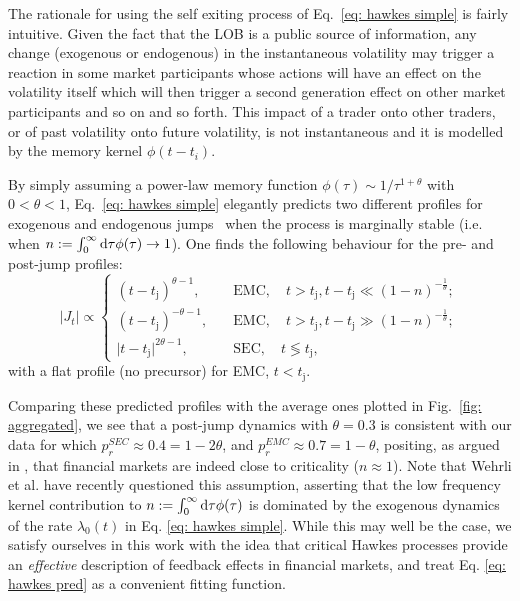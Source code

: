 \documentclass[amsmath,amssymb,aps,pre,floatfix,twocolumn,superscriptaddress]{revtex4}
\begin{document}
The rationale for using the self exiting process of Eq.~\eqref{eq: hawkes simple} is fairly intuitive. Given the fact that the LOB is a public source of information, any change (exogenous or endogenous) in the instantaneous volatility may trigger a reaction in some market participants whose actions will have an effect on the volatility itself which will then trigger a second generation effect on other market participants and so on and so forth. This impact of a trader onto other traders, or of past volatility onto future volatility, is not instantaneous and it is modelled by the memory kernel $\phi(t-t_i)$.

By simply assuming a power-law memory function $\phi(\tau) \sim 1/\tau^{1+\theta}$ with $0<\theta<1$, Eq.~\eqref{eq: hawkes simple} elegantly predicts two different profiles for exogenous and endogenous jumps~\cite{helmstetter2002subcritical,sornette_books} when the process is marginally stable (i.e. when $n := \int_0^\infty {\rm d}\tau \phi(\tau) \to 1$). One finds the following behaviour for the pre- and post-jump profiles:
\begin{equation}\label{eq: hawkes pred}
   \vert J_t \vert \propto 
   \begin{cases}
   (t - t_{\text{j}})^{\theta - 1}, \quad &\text{EMC}, \quad t > t_{\text{j}}, t - t_{\text{j}} \ll (1-n)^{-\frac{1}{\theta}};\\
   (t - t_{\text{j}})^{-\theta - 1}, \quad &\text{EMC}, \quad t > t_{\text{j}}, t - t_{\text{j}} \gg (1-n)^{-\frac{1}{\theta}};\\
   \vert t - t_{\text{j}}\vert^{2\theta - 1}, \quad &\text{SEC}, \quad t \lessgtr t_{\text{j}},
   \end{cases}
\end{equation}
with a flat profile (no precursor) for EMC, $t < t_{\text{j}}$.

Comparing these predicted profiles with the average ones plotted in Fig.~\ref{fig: aggregated}, we see that a post-jump dynamics with $\theta=0.3$ is consistent with our data for which $p_r^{SEC} \approx 0.4 = 1-2\theta$, and $p_r^{EMC}\approx 0.7 = 1-\theta$, positing, as argued in \cite{hardiman2013critical}, that financial markets are indeed close to criticality ($n \approx 1$). Note that Wehrli et al. \cite{Wehrli2021} have recently questioned this assumption, asserting that the low frequency kernel contribution to $n := \int_0^\infty {\rm d}\tau \phi(\tau)$ is dominated by the exogenous dynamics of the rate $\lambda_0(t)$ in Eq. \eqref{eq: hawkes simple}. While this may well be the case, we satisfy ourselves in this work with the idea that critical Hawkes processes provide an {\it effective} description of feedback effects in financial markets, and treat Eq. \eqref{eq: hawkes pred} as a convenient fitting function. 
\end{document}
